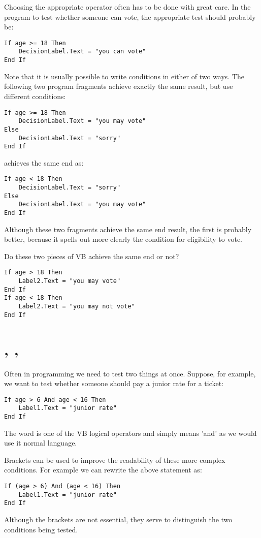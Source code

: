 		Choosing the appropriate operator often has to be done with great care. In the program to test whether someone can vote, the appropriate test should probably be:
		\begin{lstlisting}
If age >= 18 Then
	DecisionLabel.Text = "you can vote"
End If
		\end{lstlisting}
		Note that it is usually possible to write conditions in either of two ways. The following two program fragments achieve exactly the same result, but use different conditions:
\begin{lstlisting}
If age >= 18 Then
	DecisionLabel.Text = "you may vote"
Else
	DecisionLabel.Text = "sorry"
End If
\end{lstlisting}
		achieves the same end as:
		\begin{lstlisting}
If age < 18 Then
	DecisionLabel.Text = "sorry"
Else
	DecisionLabel.Text = "you may vote"
End If
		\end{lstlisting}
		Although these two fragments achieve the same end result, the first is probably better, because it spells out more clearly the condition for eligibility to vote.



		\begin{stqb}
			\begin{STQ}
				\item	Do these two pieces of VB achieve the same end or not?
					\begin{lstlisting}
If age > 18 Then
	Label2.Text = "you may vote"
End If
If age < 18 Then
	Label2.Text = "you may not vote"
End If
					\end{lstlisting}
			\end{STQ}
		\end{stqb}


	\section{, , }
		Often in programming we need to test two things at once. Suppose, for example, we want to test whether someone should pay a junior rate for a ticket:
		\begin{lstlisting}
If age > 6 And age < 16 Then
	Label1.Text = "junior rate"
End If
		\end{lstlisting}
		The word  is one of the VB logical operators and simply means 'and' as we would use it normal language.

		
		Brackets can be used to improve the readability of these more complex conditions. For example we can rewrite the above statement as:
		\begin{lstlisting}
If (age > 6) And (age < 16) Then
	Label1.Text = "junior rate"
End If
		\end{lstlisting}
		Although the brackets are not essential, they serve to distinguish the two conditions being tested. 
		

